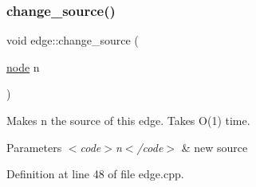 \subsubsection{\texorpdfstring{change\+\_\+source()}{change\_source()}}
{\footnotesize\ttfamily void edge\+::change\+\_\+source (\begin{DoxyParamCaption}\item[{\mbox{\hyperlink{classnode}{node}}}]{n }\end{DoxyParamCaption})}

Makes {\ttfamily n} the source of this edge. Takes O(1) time.


\begin{DoxyParams}{Parameters}
{\em $<$code$>$n$<$/code$>$} & new source \\
\hline
\end{DoxyParams}


Definition at line 48 of file edge.\+cpp.


